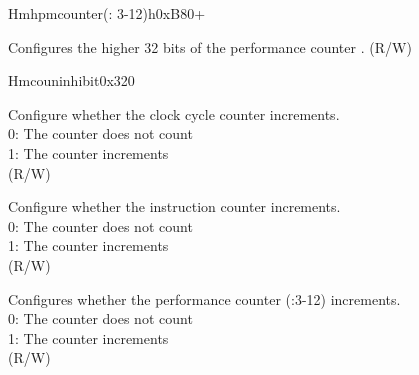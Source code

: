\begin{register}{H}{mhpmcounter(: 3-12)h}{0xB80+}\label{regdesc:LPMHPMCOUNTERH}
%
\regnewline%
\begin{regdesc}\begin{reglist}
\label{fielddesc:LPMHMPCOUNTERH}\item [MHPMCOUNTER\regindex{n}h] Configures the higher 32 bits of the performance counter . (R/W)
\end{reglist}\end{regdesc}
\end{register}


\begin{register}{H}{mcouninhibit}{0x320}\label{regdesc:LPMCOUNTINHIBIT}
%
%
%
%
\regnewline%
\begin{regdesc}\begin{reglist}
\label{fielddesc:LPMCOUNTINHIBITCY}\item [CY] Configure whether the clock cycle counter increments. \\
0: The counter does not count\\
1: The counter increments\\
(R/W)
\label{fielddesc:LPMCOUNTINHIBITIR}\item [IR] Configure whether the instruction counter increments. \\
0: The counter does not count\\
1: The counter increments\\
(R/W)
\label{fielddesc:LPMCOUNTINHIBITHPM}\item [HPM] Configures whether the performance counter (:3-12) increments. \\
0: The counter does not count\\
1: The counter increments\\
(R/W)
\end{reglist}\end{regdesc}
\end{register}
